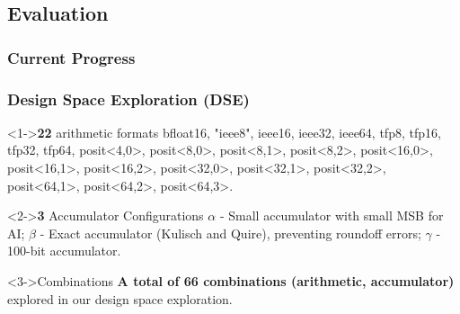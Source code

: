 \subsection{Evaluation}
\begin{frame}
    \frametitle{Current Progress}

    \tableofcontents[currentsection,
                     subsectionstyle=show/shaded/hide,
                     sectionstyle=show/hide]

\end{frame}


\begin{frame}
    \frametitle{Design Space Exploration (DSE)}

	\begin{alertblock}<1->{\textbf{22} arithmetic formats}
	bfloat16, "ieee8", ieee16, ieee32, ieee64, tfp8, tfp16, tfp32, tfp64, posit<4,0>, posit<8,0>, posit<8,1>, posit<8,2>, posit<16,0>, posit<16,1>, posit<16,2>, posit<32,0>, posit<32,1>, posit<32,2>, posit<64,1>, posit<64,2>, posit<64,3>.
    \end{alertblock}

	\begin{alertblock}<2->{\textbf{3} Accumulator Configurations}
        $\alpha$ - Small accumulator with small MSB for AI; $\beta$ - Exact accumulator (Kulisch and Quire), preventing roundoff errors; $\gamma$ - 100-bit accumulator.
    \end{alertblock}

    \begin{block}<3->{Combinations}
        \textbf{A total of \textbf{66} combinations (arithmetic, accumulator)} explored in our design space exploration.
    \end{block}
\end{frame}

